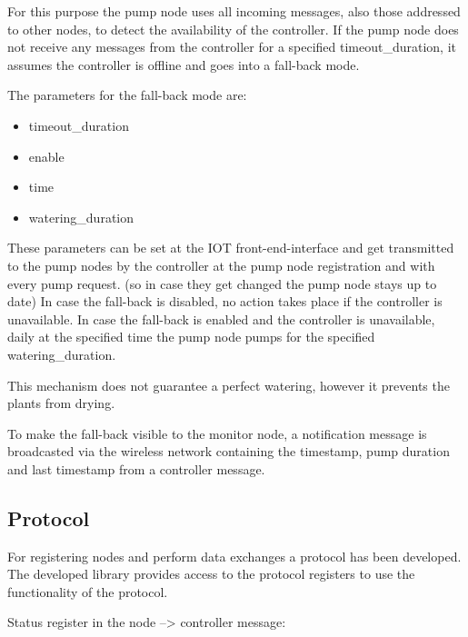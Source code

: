 \documentclass[12pt,a4paper,titlepage,oneside]{article}
\begin{document}
For this purpose the pump node uses all incoming messages, also those addressed to other nodes, to detect the availability of the controller. If the pump node does not receive any messages from the controller for a specified timeout\_duration, it assumes the controller is offline and goes into a fall-back mode.

The parameters for the fall-back mode are:
\begin{itemize}
\item timeout\_duration
\item enable
\item time
\item watering\_duration
\end{itemize}

These parameters can be set at the IOT front-end-interface and get transmitted to the pump nodes by the controller at the pump node registration and with every pump request. (so in case they get changed the pump node stays up to date)
In case the fall-back is disabled, no action takes place if the controller is unavailable.
In case the fall-back is enabled and the controller is unavailable, daily at the specified time the pump node pumps for the specified watering\_duration.

This mechanism does not guarantee a perfect watering, however it prevents the plants from drying.

To make the fall-back visible to the monitor node, a notification message is broadcasted via the wireless network containing the timestamp, pump duration and last timestamp from a controller message.


\subsection{Protocol}
For registering nodes and perform data exchanges a protocol has been developed. The developed library provides access to the protocol registers to use the functionality of the protocol.


Status register in the node --> controller message:
\end{document}
